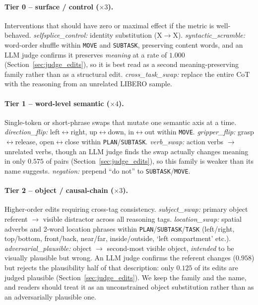 \documentclass{article}
\begin{document}
\paragraph{Tier 0 -- surface / control ($\times 3$).} Interventions that should have zero or maximal effect if the metric is well-behaved.
\emph{selfsplice\_control:} identity substitution (X$\to$X). \emph{syntactic\_scramble:} word-order shuffle within \texttt{MOVE} and \texttt{SUBTASK}, preserving content words, and an LLM judge confirms it preserves \emph{meaning} at a rate of $1.000$ (Section~\ref{sec:judge_edits}), so it is best read as a second meaning-preserving family rather than as a structural edit. \emph{cross\_task\_swap:} replace the entire CoT with the reasoning from an unrelated LIBERO sample.

\paragraph{Tier 1 -- word-level semantic ($\times 4$).} Single-token or short-phrase swaps that mutate one semantic axis at a time. \emph{direction\_flip:} left$\leftrightarrow$right, up$\leftrightarrow$down, in$\leftrightarrow$out within \texttt{MOVE}. \emph{gripper\_flip:} grasp$\leftrightarrow$release, open$\leftrightarrow$close within \texttt{PLAN}/\texttt{SUBTASK}. \emph{verb\_swap:} action verbs $\to$ unrelated verbs, though an LLM judge finds the swap actually changes meaning in only $0.575$ of pairs (Section~\ref{sec:judge_edits}), so this family is weaker than its name suggests. \emph{negation:} prepend ``do not'' to \texttt{SUBTASK}/\texttt{MOVE}.

\paragraph{Tier 2 -- object / causal-chain ($\times 3$).} Higher-order edits requiring cross-tag consistency. \emph{subject\_swap:} primary object referent $\to$ visible distractor across all reasoning tags. \emph{location\_swap:} spatial adverbs and 2-word location phrases within \texttt{PLAN}/\texttt{SUBTASK}/\texttt{TASK} (left/right, top/bottom, front/back, near/far, inside/outside, `left compartment' etc.). \emph{adversarial\_plausible:} object $\to$ second-most visible object, \emph{intended} to be visually plausible but wrong. An LLM judge confirms the referent changes ($0.958$) but rejects the plausibility half of that description: only $0.125$ of its edits are judged plausible (Section~\ref{sec:judge_edits}). We keep the family and the name, and readers should treat it as an unconstrained object substitution rather than as an adversarially plausible one.
\end{document}
